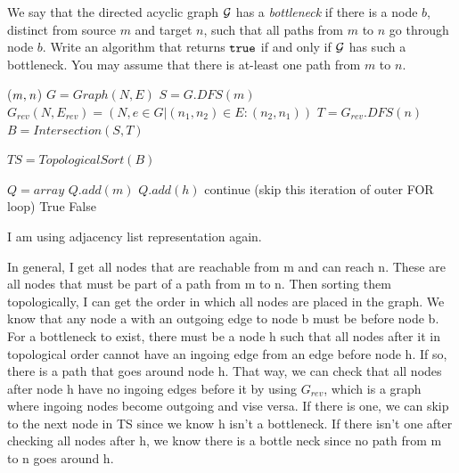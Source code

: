 \begin{problem}
\begin{questions}
\item We say that the directed acyclic graph $\mathcal{G}$ has a \emph{bottleneck} if there is a node $b$, distinct from source $m$ and target $n$, such that all paths from $m$ to $n$ go through node $b$. Write an algorithm that returns $\texttt{true}$ if  and only if $\mathcal{G}$ has such a bottleneck. You may assume that there is at-least one path from $m$ to $n$.

\begin{myalgo}{($\textit{m\/},\textit{n\/}$)}
  \STATE $G = Graph(N,E)$  
  \STATE $S = G.DFS(m)$ 
  \STATE $G_{rev}(N,E_{rev}) = (N, {e \in G | (n_1,n_2) \in E : (n_2,n_1)})$  
  \STATE $T = G_{rev}.DFS(n)$ 
  \STATE $B = Intersection(S,T)$ 
  
  \STATE $TS = TopologicalSort(B)$

  \STATE $Q = array$ 
  \STATE $Q.add(m)$
    \STATE $Q.add(h)$
        \STATE continue (skip this iteration of outer FOR loop) 
        \STATE {}
      \ENDIF
    \ENDFOR
    \RETURN True  
  \ENDFOR
  \RETURN False
\end{myalgo}

I am using adjacency list representation again.

In general, I get all nodes that are reachable from m and can reach n. These are all nodes that must be part of a path from m to n. Then sorting them topologically, I can get the order in which all nodes are placed in the graph. We know that any node a with an outgoing edge to node b must be before node b.
For a bottleneck to exist, there must be a node h such that all nodes after it in topological order cannot have an ingoing edge from an edge before node h. If so, there is a path that goes around node h. That way, we can check that all nodes after node h have no ingoing edges before it by using $G_{rev}$, which is a graph where ingoing nodes become outgoing and vise versa.
If there is one, we can skip to the next node in TS since we know h isn't a bottleneck. If there isn't one after checking all nodes after h, we know there is a bottle neck since no path from m to n goes around h.


\end{questions}
\end{problem}
